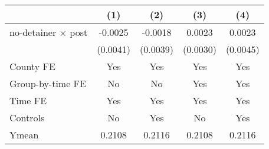 {
\def\sym#1{\ifmmode^{#1}\else\(^{#1}\)\fi}
\begin{tabular}{l*{4}{c}}
\hline\hline
                    &\multicolumn{1}{c}{(1)}         &\multicolumn{1}{c}{(2)}         &\multicolumn{1}{c}{(3)}         &\multicolumn{1}{c}{(4)}         \\
\hline
no-detainer $\times$ post&     -0.0025         &     -0.0018         &      0.0023         &      0.0023         \\
                    &    (0.0041)         &    (0.0039)         &    (0.0030)         &    (0.0045)         \\
[1em]
County FE           &         Yes         &         Yes         &         Yes         &         Yes         \\
[1em]
Group-by-time FE    &          No         &          No         &         Yes         &         Yes         \\
[1em]
Time FE             &         Yes         &         Yes         &         Yes         &         Yes         \\
[1em]
Controls            &          No         &         Yes         &          No         &         Yes         \\
\hline
Ymean               &      0.2108         &      0.2116         &      0.2108         &      0.2116         \\
\hline\hline
\end{tabular}
}
